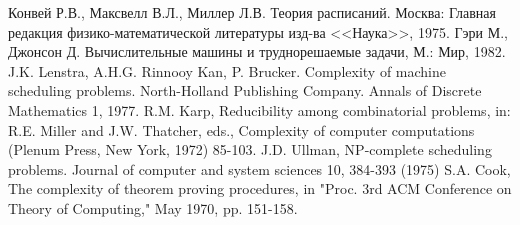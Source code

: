 \documentclass[a4paper,12pt]{article}
\theoremstyle{plain} %
\theoremstyle{definition} %
\theoremstyle{remark} %
\begin{document}
\begin{thebibliography}{6}
	 Конвей Р.В., Максвелл В.Л., Миллер Л.В. Теория расписаний. Москва: Главная редакция физико-математической литературы изд-ва <<Наука>>, 1975.
	 Гэри М., Джонсон Д. Вычислительные машины и труднорешаемые задачи, М.: Мир, 1982.
	 J.K. Lenstra, A.H.G. Rinnooy Kan, P. Brucker. Complexity of machine scheduling problems. North-Holland Publishing Company. Annals of Discrete Mathematics 1, 1977.
	 R.M. Karp, Reducibility among combinatorial problems, in: R.E. Miller and J.W. Thatcher, eds., Complexity of computer computations (Plenum Press, New York, 1972) 85-103.
	 J.D. Ullman, NP-complete scheduling problems. Journal of computer and system sciences 10, 384-393 (1975)
	 S.A. Cook, The complexity of theorem proving procedures, in "Proc. 3rd ACM Conference on Theory of Computing," May 1970, pp. 151-158.

\end{thebibliography}
\end{document}
